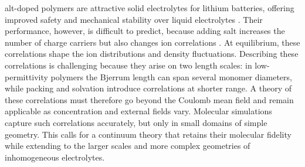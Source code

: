 alt-doped polymers are attractive solid electrolytes for lithium batteries, offering improved safety and mechanical stability over liquid electrolytes \cite{hallinan2013polymer}. Their performance, however, is difficult to predict, because adding salt increases the number of charge carriers but also changes ion correlations \cite{shen2020ion,tsamopoulos2024ion}. At equilibrium, these correlations shape the ion distributions and density fluctuations. Describing these correlations is challenging because they arise on two length scales: in low-permittivity polymers the Bjerrum length can span several monomer diameters, while packing and solvation introduce correlations at shorter range. A theory of these correlations must therefore go beyond the Coulomb mean field and remain applicable as concentration and external fields vary. Molecular simulations capture such correlations accurately, but only in small domains of simple geometry. This calls for a continuum theory that retains their molecular fidelity while extending to the larger scales and more complex geometries of inhomogeneous electrolytes.
 


